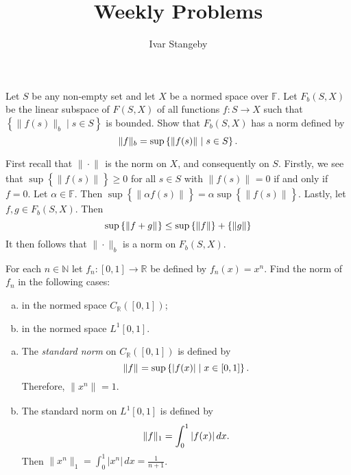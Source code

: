 \documentclass{homework}
\title{Weekly Problems}
\author{Ivar Stangeby}
\begin{document}
  \begin{problemtext}
    Let $S$ be any non-empty set and let $X$ be a normed space over
    $\mathbb{F}$. Let $F_b(S, X)$ be the linear subspace of $F(S, X)$ of all
    functions $f : S \to X$ such that $\left\{ \|f(s)\|_{b} \mid s \in S
    \right\}$ is bounded. Show that $F_b(S, X)$ has a norm defined by
    \begin{equation}
      \notag
      \|f\|_{b} = \sup \left\{ \|f(s)\|_{}\mid s \in S \right\}.
    \end{equation}
  \end{problemtext}

  \begin{solution}
    First recall that $\|\cdot\|_{}$ is the norm on $X$, and consequently on
    $S$.  Firstly, we see that $\sup \left\{ \|f(s)\|_{} \right\} \geq 0$ for
    all $s \in S$ with $\|f(s)\|_{} = 0$ if and only if $f = 0$.  Let $\alpha
    \in \mathbb{F}$. Then $\sup \left\{ \|\alpha f(s)\|_{} \right\} = \alpha
  \sup \left\{ \|f(s)\|_{} \right\}$. Lastly, let $f, g \in F_b(S, X)$. Then
\begin{equation} \notag \sup \left\{ \|f + g\|_{} \right\} \leq \sup \left\{
\|f\| \right\} + \left\{ \|g\| \right\} \end{equation} It then follows that
$\|\cdot\|_{b}$ is a norm on $F_b(S, X)$.
  \end{solution}

  \begin{problemtext}
    For each $n \in \mathbb{N}$ let $f_n : \left[ 0, 1 \right] \to \mathbb{R}$
    be defined by $f_n(x) = x^n$. Find the norm of $f_n$ in the following
    cases:
    \begin{enumerate}[a)]
      \item in the normed space $C_\mathbb{R}\left( \left[ 0, 1\right] \right)$;
      \item in the normed space $L^1[0, 1]$.
    \end{enumerate}
  \end{problemtext}
  \begin{solution}\hfill
    \begin{enumerate}[a)]
      \item The \emph{standard norm} on $C_\mathbb{R}\left( \left[ 0,1 \right]
          \right)$ is defined by
        \begin{equation}
          \notag
          \|f\|_{} = \sup \left\{ |f(x)| \mid x \in \left[ 0, 1 \right] \right\}.
        \end{equation}
        Therefore, $\|x^n\|_{} = 1$.
      \item The standard norm on $L^1[0, 1]$ is defined by
        \begin{equation}
          \notag
          \|f\|_{1} = \int_0^1 |f(x)| \, dx.
        \end{equation}
        Then $\|x^n\|_{1} = \int_0^1 |x^n| \, dx = \frac{1}{n+1}$.
    \end{enumerate}
  \end{solution}
\end{document}
